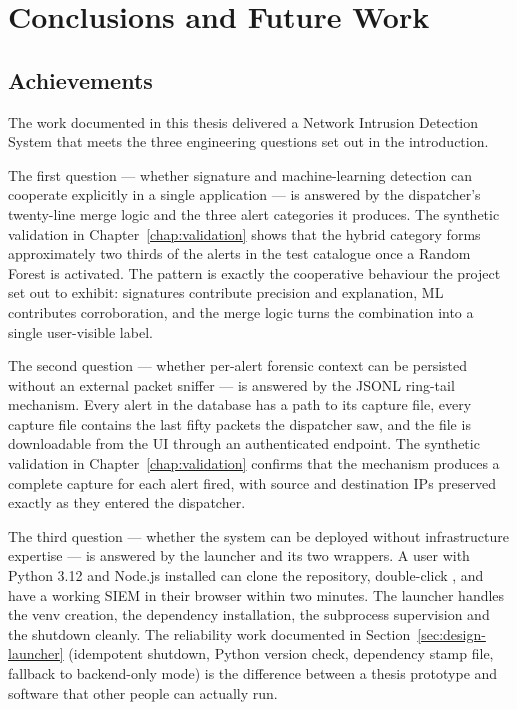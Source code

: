 \chapter{Conclusions and Future Work}
\label{chap:conclusions}

\section{Achievements}
\label{sec:conc-achievements}

The work documented in this thesis delivered a Network Intrusion
Detection System that meets the three engineering questions set
out in the introduction.

The first question --- whether signature and machine-learning
detection can cooperate explicitly in a single application ---
is answered by the dispatcher's twenty-line merge logic and the
three alert categories it produces. The synthetic validation in
Chapter~\ref{chap:validation} shows that the hybrid category
forms approximately two thirds of the alerts in the test
catalogue once a Random Forest is activated. The pattern is
exactly the cooperative behaviour the project set out to
exhibit: signatures contribute precision and explanation, ML
contributes corroboration, and the merge logic turns the
combination into a single user-visible label.

The second question --- whether per-alert forensic context can
be persisted without an external packet sniffer --- is answered
by the JSONL ring-tail mechanism. Every alert in the database
has a path to its capture file, every capture file contains the
last fifty packets the dispatcher saw, and the file is
downloadable from the UI through an authenticated endpoint. The
synthetic validation in Chapter~\ref{chap:validation} confirms
that the mechanism produces a complete capture for each alert
fired, with source and destination IPs preserved exactly as
they entered the dispatcher.

The third question --- whether the system can be deployed without
infrastructure expertise --- is answered by the
 launcher and its two wrappers. A user with Python
3.12 and Node.js installed can clone the repository, double-click
, and have a working SIEM in their browser within
two minutes. The launcher handles the venv creation, the
dependency installation, the subprocess supervision and the
shutdown cleanly. The reliability work documented in
Section~\ref{sec:design-launcher} (idempotent shutdown, Python
version check, dependency stamp file, fallback to backend-only
mode) is the difference between a thesis prototype and software
that other people can actually run.

